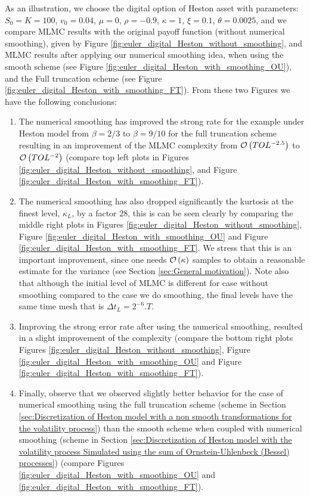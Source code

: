 As an illustration, we choose the digital option of Heston asset with parameters: $S_0=K=100$, $v_0=0.04$, $\mu=0$,  $\rho=-0.9$, $\kappa=1$, $\xi=0.1$, $\theta=0.0025$, and we compare MLMC results with the original payoff function (without numerical smoothing), given by Figure \ref{fig:euler_digital_Heston_without_smoothing},  and MLMC results after applying our numerical smoothing idea, when using the smooth scheme (see Figure \ref{fig:euler_digital_Heston_with_smoothing_OU}), and the Full truncation scheme (see Figure \ref{fig:euler_digital_Heston_with_smoothing_FT}). From these two Figures we have the following conclusions:
\begin{enumerate}

\item The numerical smoothing has improved the strong rate for  the example under Heston model from $\beta=2/3$ to $\beta=9/10$ for the full truncation scheme resulting in an improvement of the MLMC complexity from  ${\mathcal{O}}\left(TOL^{-2.5}\right)$ to ${\mathcal{O}}\left(TOL^{-2}\right)$ (compare  top left plots in Figures \ref{fig:euler_digital_Heston_without_smoothing}, and Figure \ref{fig:euler_digital_Heston_with_smoothing_FT}).
\item The numerical smoothing has also dropped significantly the kurtosis at the finest level, $\kappa_L$,  by a factor $28$, this is can be seen clearly by comparing the middle right plots in Figures \ref{fig:euler_digital_Heston_without_smoothing}, Figure \ref{fig:euler_digital_Heston_with_smoothing_OU} and Figure \ref{fig:euler_digital_Heston_with_smoothing_FT}. We stress that this is an important improvement, since one needs ${\mathcal{O}}\left(\kappa\right)$ samples  to obtain a reasonable estimate for the variance (see Section \ref{sec:General motivation}).   Note also that although the initial level of MLMC is different for case without smoothing compared to the case we do smoothing, the final levels have the same time mesh that is $\Delta t_{L}=2^{-6}.T$.
\item Improving the strong error rate after using the numerical smoothing, resulted in a slight improvement of the complexity (compare the bottom right plots Figures \ref{fig:euler_digital_Heston_without_smoothing}, Figure \ref{fig:euler_digital_Heston_with_smoothing_OU} and Figure \ref{fig:euler_digital_Heston_with_smoothing_FT}).
\item Finally, observe that we observed slightly better behavior for the case of numerical smoothing using the full truncation scheme (scheme in Section \ref{sec:Discretization of Heston model with a non smooth transformations for the volatility process}) than the smooth scheme when coupled with numerical smoothing  (scheme in Section \ref{sec:Discretization of Heston model with the volatility process Simulated using the sum of  Ornstein-Uhlenbeck (Bessel) processes})  (compare Figures \ref{fig:euler_digital_Heston_with_smoothing_OU} and  \ref{fig:euler_digital_Heston_with_smoothing_FT}).
\end{enumerate}



